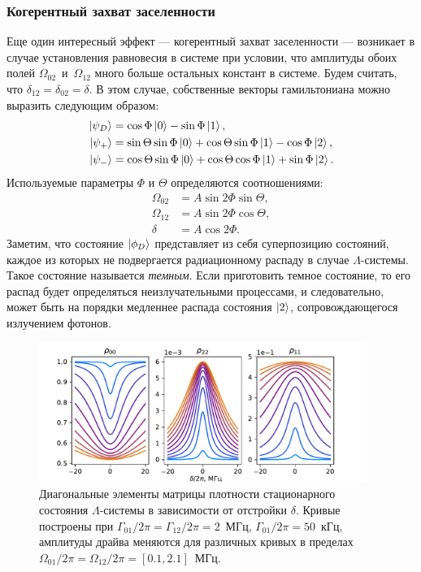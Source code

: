 \subsubsection{Когерентный захват заселенности}
Еще один интересный эффект --- когерентный захват заселенности \cite{vanier1998coherent} --- возникает в случае установления равновесия в системе при условии, что амплитуды обоих полей $\Omega_{02}$~и~$\Omega_{12}$ много больше остальных констант в системе. Будем считать, что $\delta_{12}=\delta_{02}=\delta$. В этом случае, собственные векторы гамильтониана можно выразить следующим образом:
\begin{equation}
\begin{aligned}
\ket{\psi_D} &= \cos\Phi\ket{0} - \sin\Phi\ket{1}, \\
\ket{\psi_+} &= \sin\Theta\sin\Phi \ket{0} + \cos\Theta \sin \Phi\ket{1} -\cos\Phi \ket{2}, \\
\ket{\psi_-} &= \cos\Theta\sin\Phi\ket{0} + \cos\Theta\cos\Phi\ket{1} + \sin\Phi\ket{2}.
\end{aligned}
\end{equation}
Используемые параметры $\Phi$ и $\Theta$ определяются соотношениями:
\begin{equation}
\begin{aligned}
\Omega_{02} &= A\sin 2\Phi\sin\Theta, \\
\Omega_{12} &= A\sin 2\Phi \cos\Theta, \\
\delta &= A\cos 2\Phi. 
\end{aligned}
\end{equation}
Заметим, что состояние $\ket{\phi_D}$ представляет из себя суперпозицию состояний, каждое из которых не подвергается радиационному распаду в случае $\Lambda$-системы. Такое состояние называется \textit{темным}. Если приготовить темное состояние, то его распад будет определяться неизлучательными процессами, и следовательно, может быть на порядки медленнее распада состояния $\ket{2}$, сопровождающегося излучением фотонов.
\begin{figure}[h]
	\centering
	\includegraphics[width=0.95\textwidth]{images/CPT_plot_small.pdf}	 
	\caption[Когерентный захват заселенности в $\Lambda$-системе]{Диагональные элементы матрицы плотности стационарного состояния $\Lambda$-системы в зависимости от отстройки $\delta$. Кривые построены при $\Gamma_{01}/2\pi=\Gamma_{12}/2\pi = 2$~МГц, $\Gamma_{01}/2\pi=50$~кГц, амплитуды драйва меняются для различных кривых в пределах $\Omega_{01}/2\pi=\Omega_{12}/2\pi = [0.1, 2.1]$~МГц.}
	\label{img: CPT_plot}
\end{figure}
